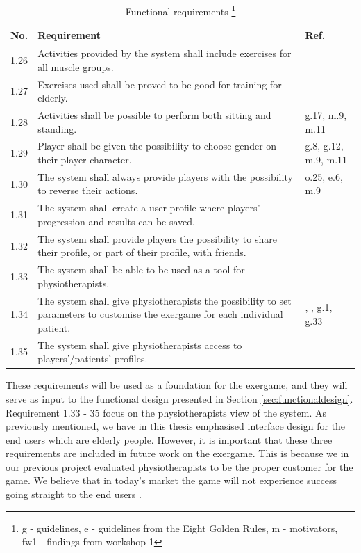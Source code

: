 \begin{minipage}{12 cm}
\begin{table} [H]
\centering
\begin{tabular}{|>{\raggedright}p{}|p{}|p{}|}
\hline
\textbf{No.} & \textbf{Requirement} & \textbf{Ref.} \\ \hline
1.26 & Activities provided by the system shall include exercises for all muscle groups. & \cite{guidelines} \\ \hline
1.27 & Exercises used shall be proved to be good for training for elderly. & \cite{project} \cite{john2012smartsenior}\\ \hline
1.28 & Activities shall be possible to perform both sitting and standing. & g.17, m.9, m.11 \\ \hline
1.29 & Player shall be given the possibility to choose gender on their player character. &  g.8, g.12, m.9, m.11 \\ \hline
1.30 & The system shall always provide players with the possibility to reverse their actions. & o.25, e.6, m.9 \\ \hline
1.31 & The system shall create a user profile where players' progression and results can be saved. & \cite{project} \cite{john2012smartsenior} \\ \hline
1.32 & The system shall provide players the possibility to share their profile, or part of their profile, with friends. &  \cite{sweetser} \\ \hline
1.33 & The system shall be able to be used as a tool for physiotherapists. & \cite{project} \cite{john2012smartsenior}\\ \hline
1.34 & The system shall give physiotherapists the possibility to set parameters to customise the exergame for each individual patient. & \cite{project}, \cite{john2012smartsenior}, g.1, g.33  \\ \hline
1.35 & The system shall give physiotherapists access to players'/patients' profiles. & \cite{project} \cite{john2012smartsenior}\\ \hline  
\end{tabular}
\caption[Functional requirements, part 3]{Functional requirements \footnote{g - guidelines, e - guidelines from the Eight Golden Rules, m - motivators, fw1 - findings from workshop 1}}
\label{tab:func3}
\end{table} 
\end{minipage}


These requirements will be used as a foundation for the exergame, and they will serve as input to the functional design presented in Section \ref{sec:functionaldesign}. Requirement 1.33 - 35 focus on the physiotherapists view of the system. As previously mentioned, we have in this thesis emphasised interface design for the end users which are elderly people. However, it is important that these three requirements are included in future work on the exergame. This is because we in our previous project \cite{project} evaluated physiotherapists to be the proper customer for the game. We believe that in today's market the game will not experience success going straight to the end users \cite{project}.  

